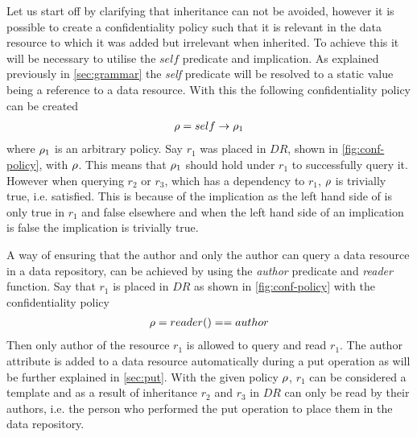\begin{example}
Let us start off by clarifying that inheritance can not be avoided, however it is possible to create a confidentiality policy such that it is relevant in the data resource to which it was added but irrelevant when inherited. To achieve this it will be necessary to utilise the $self$ predicate and implication. As explained previously in \autoref{sec:grammar} the \emph{self} predicate will be resolved to a static value being a reference to a data resource. With this the following confidentiality policy can be created 
\begin{align*}
    \rho = self \rightarrow \rho_1
\end{align*}
where $\rho_1$ is an arbitrary policy. Say $r_1$ was placed in $DR$, shown in \autoref{fig:conf-policy}, with $\rho$. This means that $\rho_1$ should hold under $r_1$ to successfully query it. However when querying $r_2$ or $r_3$, which has a dependency to $r_1$, $\rho$ is trivially true, i.e. satisfied. This is because of the implication as the left hand side of is only true in $r_1$ and false elsewhere and when the left hand side of an implication is false the implication is trivially true.
\end{example}

\begin{example}\label{ex:conf-reader-author}
A way of ensuring that the author and only the author can query a data resource in a data repository, can be achieved by using the \emph{author} predicate and \emph{reader} function. Say that $r_1$ is placed in $DR$ as shown in \autoref{fig:conf-policy} with the confidentiality policy 
\begin{align*}
    \rho = reader() == author
\end{align*}
Then only author of the resource $r_1$ is allowed to query and read $r_1$. The author attribute is added to a data resource automatically during a put operation as will be further explained in \autoref{sec:put}. With the given policy $\rho$, $r_1$ can be considered a template and as a result of inheritance $r_2$ and $r_3$ in $DR$ can only be read by their authors, i.e. the person who performed the put operation to place them in the data repository.
\end{example}

